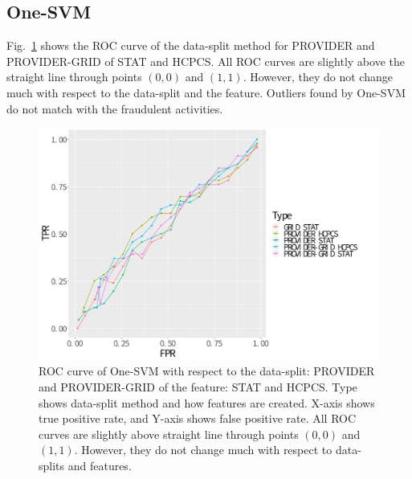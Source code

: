 \documentclass[dvipdfmx, english]{ampmt}             %
\newcommand{\Figref}[1]{Fig.~\ref{#1}}
\begin{document}

\subsection{One-SVM}

\Figref{fig:roc-svm} shows the ROC curve of the data-split method for PROVIDER and PROVIDER-GRID of STAT and HCPCS. All ROC curves are slightly above the straight line through points $(0,0)$ and $(1,1)$. 
However, they do not change much with respect to the data-split and the feature. Outliers found by One-SVM do not match with the fraudulent activities.


\begin{figure}[H]
\centerline{\includegraphics[scale=0.5]{../img/onesvm-roc.pdf}}
\caption{ROC curve of One-SVM with respect to the data-split: PROVIDER and PROVIDER-GRID of the feature: STAT and HCPCS. Type shows data-split method and how features are created.
X-axis shows true positive rate, and Y-axis shows false positive rate. All ROC curves are slightly above straight line through points $(0,0)$ and $(1,1)$. However, they do not change much 
with respect to data-splits and features.
}
\label{fig:roc-svm}
\end{figure}
\end{document}
